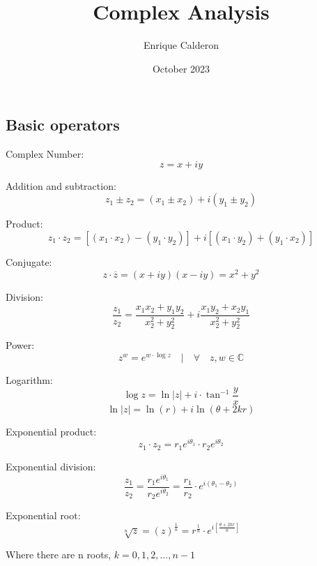 \documentclass[letterpaper]{article}
\title{Complex Analysis}
\author{Enrique Calderon}
\date{October 2023}
\newcommand{\compconj}[1]{%
	\overline{#1}%
}
\newcommand{\divline}{\noindent\makebox[\linewidth]{\rule{\textwidth}{0.4pt}}}
\newcommand{\taninv}{\tan^{-1}}
\begin{document}
        \maketitle

        \divline

	\begin{multicols}{3}
		\section{Basic operators}
		
			Complex Number:
			\[z = x + iy\]
			
			Addition and subtraction:
			\[z_1 \pm z_2 = (x_1 \pm x_2) + i(y_1 \pm y_2)\]
			
			Product:
			\[z_1 \cdot z_2 = [(x_1 \cdot x_2) - (y_1 \cdot y_2)] + i[(x_1 \cdot y_2) + (y_1 \cdot x_2)]\]
			
			Conjugate:
			\[z \cdot \compconj{z} = (x + iy)(x - iy) = x^{2} + y^{2}\]
			
			Division:
			\[\frac{z_1}{z_2} = \frac{x_1 x_2 + y_1 y_2}{x_2^{2} + y_2^{2}} + i \frac{x_1 y_2 + x_2 y_1}{x_2^{2} + y_2^{2}}\]
			
			Power:
			\[z^{w} = e^{w \cdot \log{z}} \quad | \quad \forall \quad z,w \in \mathbb{C}\]

			Logarithm:
			\[\log{z} = \ln{|z|} + i \cdot \taninv{\frac{y}{x}}\]
			\[\ln{|z|} = \ln(r) + i\ln(\theta + 2kr)\]
			
			Exponential product:
			\[z_1 \cdot z_2 = r_1 e^{i\theta_1} \cdot r_2 e^{i\theta_2} \]
			
			Exponential division:
			\[\frac{z_1}{z_2} = \frac{r_1 e^{i\theta_1}}{r_2 e^{i\theta_2}} = \frac{r_1}{r_2} \cdot e^{i(\theta_1 - \theta_2)}\]
			
			Exponential root:
			\[\sqrt[n]{z} = (z)^{\frac{1}{n}} = r^{\frac{1}{n}} \cdot e^{i[\frac{\theta + 2kr}{n}]}\]
			
			Where there are n roots, \(k = 0, 1 , 2 , ... , n-1\)
	\end{multicols}
 
	\divline
 
\end{document}
